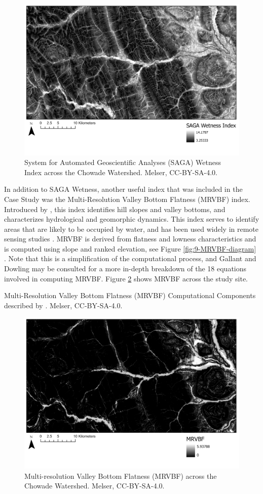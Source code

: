 \documentclass[
]{book}
\begin{document}
\begin{figure}
\includegraphics[width=0.75\linewidth]{images/09-SAGA-Wetness} \caption{System for Automated Geoscientific Analyses (SAGA) Wetness Index across the Chowade Watershed. Melser, CC-BY-SA-4.0.}\label{fig:9-SAGA-Wetness}
\end{figure}

In addition to SAGA Wetness, another useful index that was included in the Case Study was the Multi-Resolution Valley Bottom Flatness (MRVBF) index. Introduced by \citep{gallant_multiresolution_2003}, this index identifies hill slopes and valley bottoms, and characterizes hydrological and geomorphic dynamics. This index serves to identify areas that are likely to be occupied by water, and has been used widely in remote sensing studies \citep{huang_comparison_2017}. MRVBF is derived from flatness and lowness characteristics and is computed using slope and ranked elevation, see Figure \ref{fig:9-MRVBF-diagram} \citep{gallant_multiresolution_2003}. Note that this is a simplification of the computational process, and Gallant and Dowling may be consulted for a more in-depth breakdown of the 18 equations involved in computing MRVBF. Figure \ref{fig:9-MRVBF} shows MRVBF across the study site.



\label{fig:9-MRVBF-diagram}Multi-Resolution Valley Bottom Flatness (MRVBF) Computational Components described by \citep{gallant_multiresolution_2003}. Melser, CC-BY-SA-4.0.

\begin{figure}
\includegraphics[width=0.75\linewidth]{images/09-MRVBF} \caption{Multi-resolution Valley Bottom Flatness (MRVBF) across the Chowade Watershed. Melser, CC-BY-SA-4.0.}\label{fig:9-MRVBF}
\end{figure}
\end{document}
